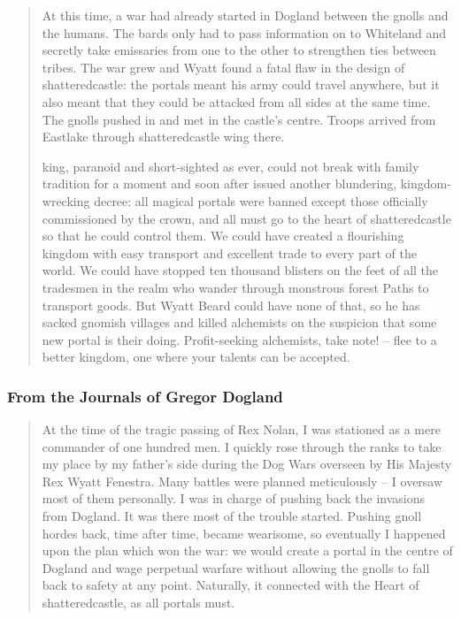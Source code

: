 \begin{multicols}{2}
\begin{quotation}
	At this time, a war had already started in Dogland between the gnolls and the humans.
	The bards only had to pass information on to Whiteland and secretly take emissaries from one to the other to strengthen ties between tribes.
	The war grew and Wyatt found a fatal flaw in the design of \gls{shatteredcastle}: the portals meant his army could travel anywhere, but it also meant that they could be attacked from all sides at the same time.
	The gnolls pushed in and met in the castle's centre.
	Troops arrived from Eastlake through \gls{shatteredcastle} wing there.

	\Gls{king}, paranoid and short-sighted as ever, could not break with family tradition for a moment and soon after issued another blundering, kingdom-wrecking decree: all magical portals were banned except those officially commissioned by the crown, and all must go to the heart of \gls{shatteredcastle} so that he could control them.
	We could have created a flourishing kingdom with easy transport and excellent trade to every part of the world.
	We could have stopped ten thousand blisters on the feet of all the tradesmen in the realm who wander through monstrous forest Paths to transport goods.
	But Wyatt Beard could have none of that, so he has sacked gnomish villages and killed alchemists on the suspicion that some new portal is their doing.
	Profit-seeking alchemists, take note! -- flee to a better kingdom, one where your talents can be accepted.

\end{quotation}

\subsubsection{From the Journals of Gregor Dogland}


\begin{quotation}

	At the time of the tragic passing of Rex Nolan, I was stationed as a mere commander of one hundred men.
	I quickly rose through the ranks to take my place by my father's side during the Dog Wars overseen by His Majesty Rex Wyatt Fenestra.
	Many battles were planned meticulously -- I oversaw most of them personally.
	I was in charge of pushing back the invasions from Dogland.
	It was there most of the trouble started.
	Pushing gnoll hordes back, time after time, became wearisome, so eventually I happened upon the plan which won the war: we would create a portal in the centre of Dogland and wage perpetual warfare without allowing the gnolls to fall back to safety at any point.
	Naturally, it connected with the Heart of \gls{shatteredcastle}, as all portals must.


\end{quotation}
\end{multicols}

